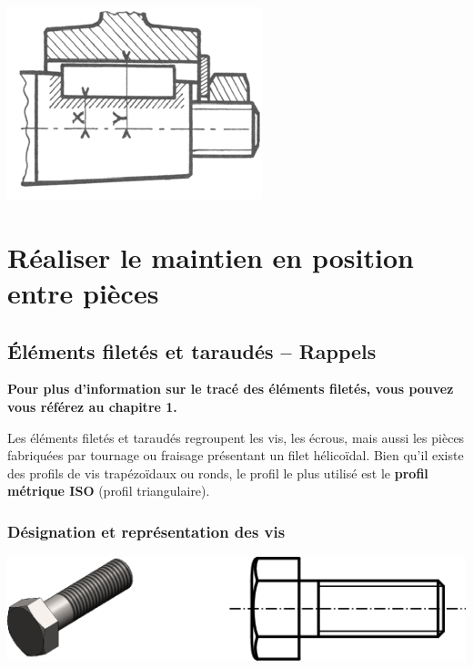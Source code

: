 \documentclass[11pt,oneside]{article}
\begin{document}
\begin{minipage}[c]{.3\linewidth}
\begin{center}
\includegraphics[width=.9\textwidth]{png/cone_9}
\end{center}
\end{minipage}

\vspace{.5cm}

\section{Réaliser le maintien en position entre pièces}
\subsection{Éléments filetés et taraudés -- Rappels}

\textbf{Pour plus d'information sur le tracé des éléments filetés, vous pouvez vous référez au chapitre 1.}


Les éléments filetés et taraudés regroupent les vis, les écrous, mais aussi les pièces fabriquées par tournage ou fraisage présentant un filet hélicoïdal. Bien qu'il existe des profils de vis trapézoïdaux ou ronds, le profil le plus utilisé est le \textbf{profil métrique ISO} (profil triangulaire).

\subsubsection{Désignation et représentation des vis}

\begin{center}
\includegraphics[width=.5\textwidth]{png/vis_rep}
\end{center}
\end{document}
